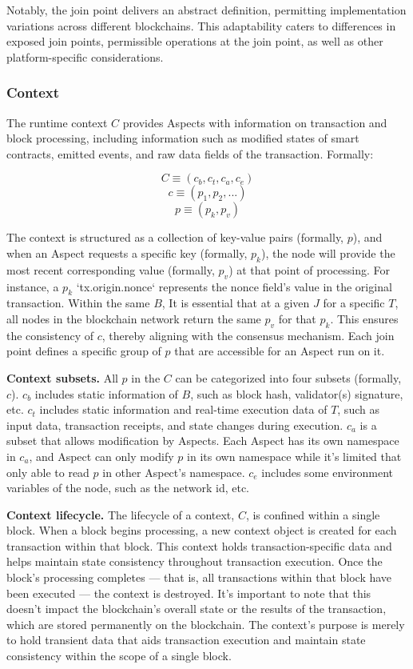 Notably, the join point delivers an abstract definition, permitting implementation variations across different blockchains. This adaptability caters to differences in exposed join points, permissible operations at the join point, as well as other platform-specific considerations.

\subsubsection{Context}

The runtime context $C$ provides Aspects with information on transaction and block processing, including information such as modified states of smart contracts, emitted events, and raw data fields of the transaction. Formally: 

$$
C \equiv (c_b, c_t, c_a, c_e)
$$
$$
c \equiv (p_1, p_2,...)
$$
$$
p \equiv (p_{k}, p_{v})
$$

The context is structured as a collection of key-value pairs (formally, $p$), and when an Aspect requests a specific key (formally, $p_k$), the node will provide the most recent corresponding value (formally, $p_v$) at that point of processing. For instance, a $p_k$ `tx.origin.nonce` represents the nonce field’s value in the original transaction. Within the same $B$, It is essential that at a given $J$ for a specific $T$, all nodes in the blockchain network return the same $p_v$ for that $p_k$. This ensures the consistency of $c$, thereby aligning with the consensus mechanism. Each join point defines a specific group of $p$ that are accessible for an Aspect run on it.

\textbf{Context subsets.} All $p$ in the $C$ can be categorized into four subsets (formally, $c$). $c_{b}$ includes static information of $B$, such as block hash, validator(s) signature, etc. $c_{t}$ includes static information and real-time execution data of $T$, such as input data, transaction receipts, and state changes during execution. $c_a$ is a subset that allows modification by Aspects. Each Aspect has its own namespace in $c_a$, and Aspect can only modify $p$ in its own namespace while it’s limited that only able to read $p$ in other Aspect’s namespace. $c_e$ includes some environment variables of the node, such as the network id, etc.

\textbf{Context lifecycle.} The lifecycle of a context, $C$, is confined within a single block. When a block begins processing, a new context object is created for each transaction within that block. This context holds transaction-specific data and helps maintain state consistency throughout transaction execution. Once the block's processing completes — that is, all transactions within that block have been executed — the context is destroyed. It's important to note that this doesn't impact the blockchain's overall state or the results of the transaction, which are stored permanently on the blockchain. The context's purpose is merely to hold transient data that aids transaction execution and maintain state consistency within the scope of a single block.

